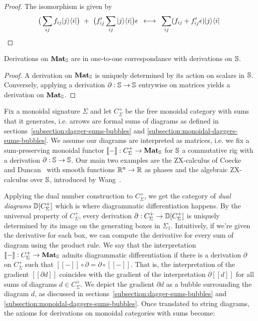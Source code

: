 \begin{proof}
The isomorphism is given by
$$\big( \sum_{ij} f_{ij} \ket{j} \bra{i} \big)
\ + \ \big( f'_{ij} \sum_{ij} \ket{j}  \bra{i} \big) \epsilon
\s \longleftrightarrow \s
\sum_{ij} (f_{ij} + f'_{ij} \epsilon) \ket{j} \bra{i}$$
\end{proof}

\begin{proposition}
Derivations on $\mathbf{Mat}_\S$ are in one-to-one correspondance with
derivations on $\S$.
\end{proposition}

\begin{proof}
A derivation on $\mathbf{Mat}_\S$ is uniquely determined by its action on
scalars in $\S$. Conversely, applying a derivation $\partial : \S \to \S$
entrywise on matrices yields a derivation on $\mathbf{Mat}_\S$.
\end{proof}

Fix a monoidal signature $\Sigma$ and let $C_\Sigma^+$ be the free monoidal category with sums that it generates, i.e. arrows are formal sums of diagrams as defined in sections~\ref{subsection:dagger-sums-bubbles} and \ref{subsection:monoidal-daggers-sums-bubbles}.
We assume our diagrams are interpreted as matrices, i.e. we fix a sum-preserving monoidal functor $[\![-]\!]  : C_\Sigma^+ \to \mathbf{Mat}_\S$ for $\S$ a commutative rig with a derivation $\partial : \S \to \S$.
Our main two examples are the ZX-calculus of Coecke and Duncan~\cite{CoeckeDuncan08} with smooth functions $\R^n \to \R$ as phases and the algebraic ZX-calculus over $\S$, introduced by Wang~\cite{Wang20}.

Applying the dual number construction to $C_\Sigma^+$, we get the category of \emph{dual diagrams} $\D[C_\Sigma^+]$ which is where diagrammatic differentiation happens.
By the universal property of $C_\Sigma^+$, every derivation $\partial : C_\Sigma^+ \to \D[C_\Sigma^+]$ is uniquely determined by its image on the generating boxes in $\Sigma_1$.
Intuitively, if we're given the derivative for each box, we can compute the derivative for every sum of diagram using the product rule.
We say that the interpretation $[\![-]\!] : C_\Sigma^+ \to \mathbf{Mat}_\S$ admits diagrammatic differentiation if there is a derivation $\partial$ on $C_\Sigma^+$ such that $[\![-]\!] \circ \partial = \partial \circ [\![-]\!]$.
That is, the interpretation of the gradient $[\![\partial d]\!]$ coincides with the gradient of the interpretation $\partial [\![d]\!]$ for all sums of diagrams $d \in C_\Sigma^+$.
We depict the gradient $\partial d$ as a bubble surrounding the diagram $d$, as discussed in sections~\ref{subsection:dagger-sums-bubbles} and \ref{subsection:monoidal-daggers-sums-bubbles}.
Once translated to string diagrams, the axioms for derivations on monoidal
categories with sums become:

